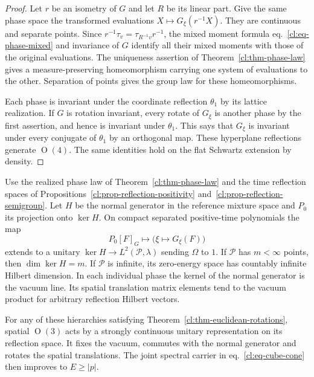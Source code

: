 \documentclass[11pt,letterpaper,reqno]{amsart}
\makeatletter
\numberwithin{equation}{section}
\renewcommand{\eqref}[1]{\textup{eq.~\ref{#1}}}
\theoremstyle{definition}
\newcommand{\ms@minorstart}{%
  \pushQED{\qed}\renewcommand{\qedsymbol}{$\blacksquare$}}
\newenvironment{proposition}[1][]{\ms@minorstart\ms@proposition[#1]}
  {\popQED\endms@proposition}
\theoremstyle{remark}
\makeatother
\begin{document}
\begin{proof}
Let \(r\) be an isometry of \(G\) and let \(R\) be
its linear part. Give the same phase space the transformed
evaluations \(X\mapsto G_\xi(r^{-1}X)\).
They are continuous and separate points.
Since \(r^{-1}\tau_v=\tau_{R^{-1}v}r^{-1}\),
the mixed moment formula \eqref{cl:eq-phase-mixed}
and invariance of \(G\) identify all their mixed moments
with those of the original evaluations. The uniqueness
assertion of Theorem~\ref{cl:thm-phase-law} gives a
measure-preserving homeomorphism carrying one system of
evaluations to the other. Separation of points gives the
group law for these homeomorphisms.

Each phase is invariant under the coordinate reflection
\(\theta_1\) by its lattice realization. If \(G\) is
rotation invariant, every rotate of \(G_\xi\) is another
phase by the first assertion, and hence is invariant under
\(\theta_1\). This says that \(G_\xi\) is invariant under
every conjugate of \(\theta_1\) by an orthogonal map.
These hyperplane reflections generate \(\operatorname{O}(4)\).
The same identities hold on the flat Schwartz extension
by density.
\end{proof}



\begin{proposition}[The zero-energy space and spatial rotations]
\label{cl:prop-phase-hilbert}
Use the realized phase law of Theorem~\ref{cl:thm-phase-law}
and the time reflection spaces of
Propositions~\ref{cl:prop-reflection-positivity}
and~\ref{cl:prop-reflection-semigroup}. Let \(H\) be the normal
generator in the reference mixture space and \(P_0\) its
projection onto \(\ker H\). On compact separated positive-time
polynomials the map
\[
 P_0[F]_G\longmapsto \bigl(\xi\longmapsto G_\xi(F)\bigr)
\]
extends to a unitary \(\ker H\to L^2(\mathcal P,\lambda)\)
sending \(\Omega\) to \(1\).
If \(\mathcal P\) has \(m<\infty\) points, then
\(\dim\ker H=m\). If \(\mathcal P\) is infinite, its zero-energy
space has countably infinite Hilbert dimension. In each
individual phase the kernel of the normal generator is the
vacuum line. Its spatial translation matrix elements tend
to the vacuum product for arbitrary reflection Hilbert
vectors.

For any of these hierarchies satisfying
Theorem~\ref{cl:thm-euclidean-rotations}, spatial
\(\operatorname{O}(3)\) acts by a strongly continuous unitary
representation on its reflection space. It fixes the vacuum,
commutes with the normal generator and rotates the spatial
translations. The joint spectral carrier in
\eqref{cl:eq-cube-cone} then improves to \(E\ge|p|\).
\end{proposition}
\end{document}
